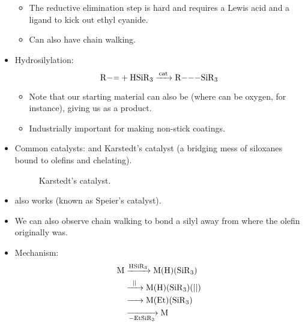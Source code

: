 \documentclass[../notes.tex]{subfiles}
\begin{document}
\begin{itemize}
\begin{itemize}
        \item The reductive elimination step is hard and requires a Lewis acid and a ligand to kick out ethyl cyanide.
        \item Can also have chain walking.
    \end{itemize}
    \item Hydrosilylation:
    \begin{equation*}
        \ce{R-= + HSiR3 ->[{cat}] R---SiR3}
    \end{equation*}
    \begin{itemize}
        \item Note that our starting material can also be  (where  can be oxygen, for instance), giving us  as a product.
        \item Industrially important for making non-stick coatings.
    \end{itemize}
    \item Common catalysts:  and Karstedt's catalyst (a bridging mess of siloxanes bound to olefins and chelating).
    \begin{figure}[h!]
        \centering
        \caption{Karstedt's catalyst.}
        \label{fig:karstedtCatalyst}
    \end{figure}
    \item {} also works (known as Speier's catalyst).
    \item We can also observe chain walking to bond a silyl away from where the olefin originally was.
    \item Mechanism:
    \begin{align*}
        \ce{M} &\ce{->[HSiR3]} \ce{M(H)(SiR3)}\\
        &\ce{->[||]} \ce{M(H)(SiR3)(||)}\\
        &\ce{->} \ce{M(Et)(SiR3)}\\
        &\ce{->[][-EtSiR3]} \ce{M}
    \end{align*}
    \begin{itemize}

\end{itemize}
\end{itemize}
\end{document}
